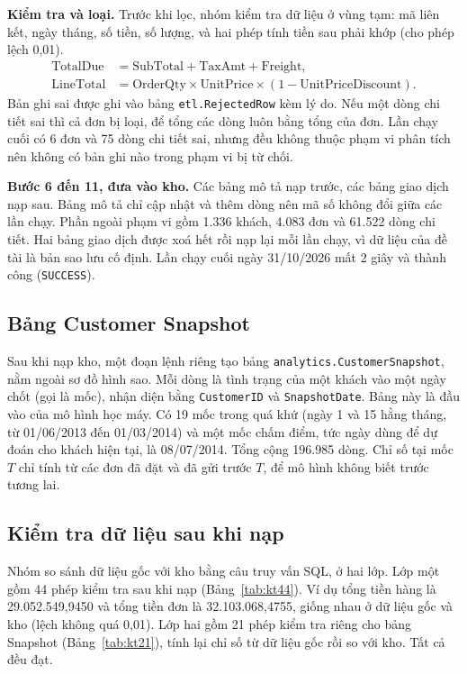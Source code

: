 \textbf{Kiểm tra và loại.} Trước khi lọc, nhóm kiểm tra dữ liệu ở vùng tạm: mã liên kết, ngày tháng, số tiền, số lượng, và hai phép tính tiền sau phải khớp (cho phép lệch 0,01).
\begin{align*}
\text{TotalDue} &= \text{SubTotal} + \text{TaxAmt} + \text{Freight}, \\
\text{LineTotal} &= \text{OrderQty} \times \text{UnitPrice} \times (1 - \text{UnitPriceDiscount}).
\end{align*}
Bản ghi sai được ghi vào bảng \texttt{etl.RejectedRow} kèm lý do. Nếu một dòng chi tiết sai thì cả đơn bị loại, để tổng các dòng luôn bằng tổng của đơn. Lần chạy cuối có 6 đơn và 75 dòng chi tiết sai, nhưng đều không thuộc phạm vi phân tích nên không có bản ghi nào trong phạm vi bị từ chối.

\textbf{Bước 6 đến 11, đưa vào kho.} Các bảng mô tả nạp trước, các bảng giao dịch nạp sau. Bảng mô tả chỉ cập nhật và thêm dòng nên mã số không đổi giữa các lần chạy. Phần ngoài phạm vi gồm 1.336 khách, 4.083 đơn và 61.522 dòng chi tiết. Hai bảng giao dịch được xoá hết rồi nạp lại mỗi lần chạy, vì dữ liệu của đề tài là bản sao lưu cố định. Lần chạy cuối ngày 31/10/2026 mất 2 giây và thành công (\texttt{SUCCESS}).

\subsection{Bảng Customer Snapshot}
Sau khi nạp kho, một đoạn lệnh riêng tạo bảng \texttt{analytics.\allowbreak CustomerSnapshot}, nằm ngoài sơ đồ hình sao. Mỗi dòng là tình trạng của một khách vào một ngày chốt (gọi là mốc), nhận diện bằng \texttt{CustomerID} và \texttt{SnapshotDate}. Bảng này là đầu vào của mô hình học máy. Có 19 mốc trong quá khứ (ngày 1 và 15 hằng tháng, từ 01/06/2013 đến 01/03/2014) và một mốc chấm điểm, tức ngày dùng để dự đoán cho khách hiện tại, là 08/07/2014. Tổng cộng 196.985 dòng. Chỉ số tại mốc $T$ chỉ tính từ các đơn đã đặt và đã gửi trước $T$, để mô hình không biết trước tương lai.

\subsection{Kiểm tra dữ liệu sau khi nạp}
Nhóm so sánh dữ liệu gốc với kho bằng câu truy vấn SQL, ở hai lớp. Lớp một gồm 44 phép kiểm tra sau khi nạp (Bảng~\ref{tab:kt44}). Ví dụ tổng tiền hàng là 29.052.549,9450 và tổng tiền đơn là 32.103.068,4755, giống nhau ở dữ liệu gốc và kho (lệch không quá 0,01). Lớp hai gồm 21 phép kiểm tra riêng cho bảng Snapshot (Bảng~\ref{tab:kt21}), tính lại chỉ số từ dữ liệu gốc rồi so với kho. Tất cả đều đạt.

